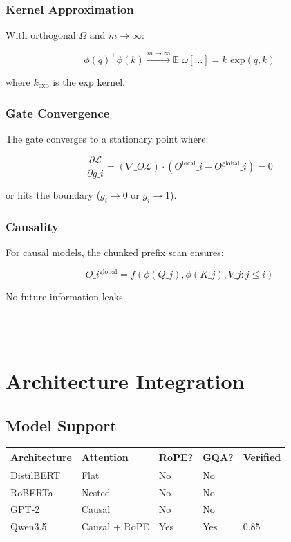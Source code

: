 \subsubsection{Kernel Approximation}

With orthogonal $\Omega$ and $m \to \infty$:

\[
\phi(q)^\top \phi(k) \xrightarrow{m \to \infty} \mathbb{E}\_\omega[\ldots] = k\_\text{exp}(q, k)
\tag{4.13}
\]

where $k_\text{exp}$ is the exp kernel.

\subsubsection{Gate Convergence}

The gate converges to a stationary point where:

\[
\frac{\partial \mathcal{L}}{\partial g\_i} = (\nabla\_O \mathcal{L}) \cdot (O^\text{local}\_i - O^\text{global}\_i) = 0
\tag{4.14}
\]

or hits the boundary ($g_i \to 0$ or $g_i \to 1$).

\subsubsection{Causality}

For causal models, the chunked prefix scan ensures:

\[
O\_i^\text{global} = f(\phi(Q\_j), \phi(K\_j), V\_j : j \leq i)
\tag{4.15}
\]

No future information leaks.
\begin{lstlisting}

---
\end{lstlisting}


\section{Architecture Integration}

\subsection{Model Support}

\begin{table}[H]
\centering
\small
\begin{tabular}{lllll}
\toprule
\textbf{Architecture} & \textbf{Attention} & \textbf{RoPE?} & \textbf{GQA?} & \textbf{Verified} \\
\midrule
DistilBERT & Flat & No & No &  \\
RoBERTa & Nested & No & No &  \\
GPT-2 & Causal & No & No &  \\
Qwen3.5 & Causal + RoPE & Yes & Yes & 0.85 \\
\bottomrule
\end{tabular}
\end{table}

